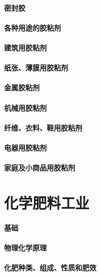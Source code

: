 \documentclass[UTF8]{../../ApplicationUniverse}
\begin{document}
    \subsubsection{密封胶}
\subsubsection{各种用途的胶粘剂}
    \subsubsection{建筑用胶粘剂}
    \subsubsection{纸张、薄膜用胶粘剂}
    \subsubsection{金属胶粘剂}
    \subsubsection{机械用胶粘剂}
    \subsubsection{纤维、衣料、鞋用胶粘剂}
    \subsubsection{电器用胶粘剂}
    \subsubsection{家庭及小商品用胶粘剂}









\chapter{化学肥料工业}
\subsubsection{基础}
    \subsubsection{物理化学原理}
    \subsubsection{化肥种类、组成、性质和肥效}
\end{document}
